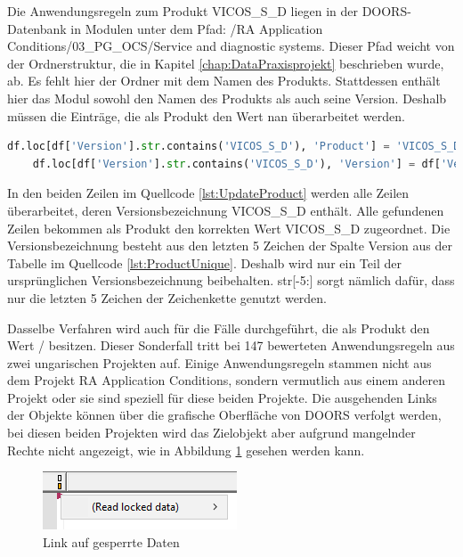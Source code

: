 Die Anwendungsregeln zum Produkt \glqq VICOS\_S\_D\grqq{} liegen in der \ac{DOORS}-Datenbank in Modulen unter dem Pfad: /RA Application Conditions/03\_PG\_OCS/Service and diagnostic systems.
Dieser Pfad weicht von der Ordnerstruktur, die in Kapitel \ref*{chap:DataPraxisprojekt} beschrieben wurde, ab. Es fehlt hier der Ordner mit dem Namen des Produkts.
Stattdessen enthält hier das Modul sowohl den Namen des Produkts als auch seine Version. Deshalb müssen die Einträge, die als Produkt den Wert \glqq nan\grqq{}
überarbeitet werden. 

\begin{lstlisting}[language = python, caption={Eintragen der korrekten Produkt- und Versionsbezeichnung},captionpos=b, label = lst:UpdateProduct, floatplacement=H]
    df.loc[df['Version'].str.contains('VICOS_S_D'), 'Product'] = 'VICOS_S_D'
    df.loc[df['Version'].str.contains('VICOS_S_D'), 'Version'] = df['Version'].str[-5:]  
\end{lstlisting}

In den beiden Zeilen im Quellcode \ref*{lst:UpdateProduct} werden alle Zeilen überarbeitet, deren Versionsbezeichnung \glqq VICOS\_S\_D\grqq{} enthält.
Alle gefundenen Zeilen bekommen als Produkt den korrekten Wert \glqq VICOS\_S\_D\grqq{} zugeordnet. Die Versionsbezeichnung besteht aus den letzten 5 Zeichen
der Spalte \glqq Version\grqq{} aus der Tabelle im Quellcode \ref*{lst:ProductUnique}. Deshalb wird nur ein Teil der ursprünglichen Versionsbezeichnung
beibehalten. str[-5:] sorgt nämlich dafür, dass nur die letzten 5 Zeichen der Zeichenkette genutzt werden.

Dasselbe Verfahren wird auch für die Fälle durchgeführt, die als Produkt den Wert \glqq /\grqq{} besitzen. Dieser Sonderfall tritt bei 147 bewerteten Anwendungsregeln
aus zwei ungarischen Projekten auf.
Einige Anwendungsregeln stammen nicht aus dem Projekt RA Application Conditions, sondern vermutlich aus einem anderen Projekt oder sie sind speziell 
für diese beiden Projekte. Die ausgehenden Links der Objekte können über die grafische Oberfläche von \ac{DOORS} verfolgt werden, bei diesen beiden Projekten
wird das Zielobjekt aber aufgrund mangelnder Rechte nicht angezeigt, wie in Abbildung \ref{fig:LockedData} gesehen werden kann. 

\begin{figure}[H]
    \centering
    \includegraphics[width = \textwidth/2]{abbildungen/LockedData.PNG}
    \caption{Link auf gesperrte Daten}
    \label{fig:LockedData}
\end{figure}

